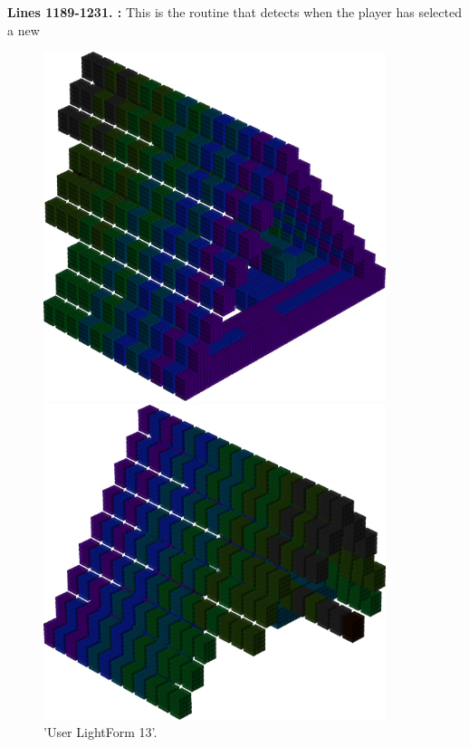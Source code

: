 \textbf{Lines 1189-1231. :} This is the routine that detects when the player has selected a new
\clearpage
%
%
\begin{minipage}[b]{0.48\linewidth}
\begin{figure}[H]
    \centering
    \begin{adjustbox}{width=5cm,margin=0cm 0cm}
      \includegraphics[width=10cm]{src/colorspace_patterns/pattern21-45.png}%
    \end{adjustbox}
    \begin{adjustbox}{width=5cm,margin=0cm 0cm}
      \includegraphics[width=10cm]{src/colorspace_patterns/pattern21-225.png}%
    \end{adjustbox}
\caption{'User LightForm 13'.}
\end{figure}
\end{minipage}
